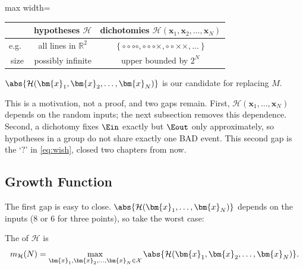 \begin{center}
    \solidrules
    \begin{adjustbox}{max width=\textwidth}
        \begin{tabular}{@{}c|c|c@{}}
            \toprule
            & hypotheses \(\mathcal{H}\)
            & dichotomies \(\mathcal{H}(\bm{x}_1, \bm{x}_2, \dots , \bm{x}_N)\)\\
            \midrule
            e.g.\ & all lines in \(\mathbb{R}^2\)
            & \(\left\{ \circ\circ\circ\circ , \circ\circ\circ\times ,
                \circ\circ\times\times , \dots \right\}\)\\
            size & possibly infinite & upper bounded by \(2^N\)\\
            \bottomrule
        \end{tabular}
    \end{adjustbox}
\end{center}

\begin{moral}
    \(\abs{\mathcal{H}(\bm{x}_1, \bm{x}_2, \dots , \bm{x}_N)}\) is our candidate
    for replacing \(M\).
\end{moral}

\begin{note}
    This is a motivation, not a proof, and two gaps remain. First,
    \(\mathcal{H}(\bm{x}_1, \dots , \bm{x}_N)\) depends on the random inputs;
    the next subsection removes this dependence. Second, a dichotomy fixes
    \(\Ein\) exactly but \(\Eout\) only approximately, so hypotheses in a group
    do not share exactly one BAD event. This second gap is the `\(?\)' in
    \autoref{eq:wish}, closed two chapters from now.
\end{note}

\subsection{Growth Function}

The first gap is easy to close. \(\abs{\mathcal{H}(\bm{x}_1, \dots ,
\bm{x}_N)}\) depends on the inputs (\(8\) or \(6\) for three points), so take the
worst case:

\begin{definition}\label{def:growth}
    The  of \(\mathcal{H}\) is
    \[
        m_{\mathcal{H}}(N)
        = \max_{\bm{x}_1, \bm{x}_2, \dots , \bm{x}_N \in \mathcal{X}}
        \abs{\mathcal{H}(\bm{x}_1, \bm{x}_2, \dots , \bm{x}_N)} .
    \]
\end{definition}

